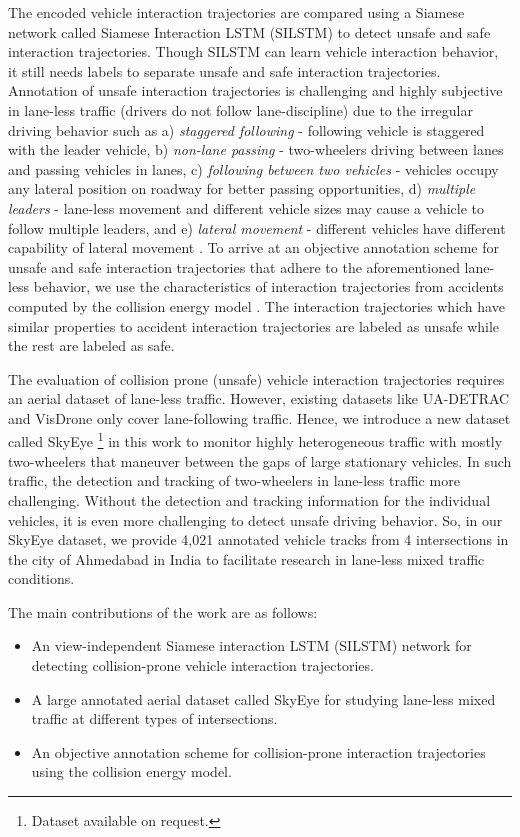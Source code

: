 \documentclass[final,journal]{IEEEtran}
\begin{document}
The encoded vehicle interaction trajectories are compared using a Siamese network called Siamese Interaction LSTM (SILSTM) to detect unsafe and safe interaction trajectories. Though SILSTM can learn vehicle interaction behavior, it still needs labels to separate unsafe and safe interaction trajectories. Annotation of unsafe interaction trajectories is challenging and highly subjective in lane-less traffic (drivers do not follow lane-discipline) due to the irregular driving behavior such as a) \textit{staggered following} - following vehicle is staggered with the leader vehicle, b) \textit{non-lane passing} - two-wheelers driving between lanes and passing vehicles in lanes, c) \textit{following between two vehicles} - vehicles occupy any lateral position on roadway for better passing opportunities, d) \textit{multiple leaders} - lane-less movement and different vehicle sizes may cause a vehicle to follow multiple leaders, and e) \textit{lateral movement} - different vehicles have different capability of lateral movement \cite{lanelessbehavior}. To arrive at an objective annotation scheme for unsafe and safe interaction trajectories that adhere to the aforementioned lane-less behavior, we use the characteristics of interaction trajectories from accidents computed by the collision energy model \cite{whoareyouwith}. The interaction trajectories which have similar properties to accident interaction trajectories are labeled as unsafe while the rest are labeled as safe.

The evaluation of collision prone (unsafe) vehicle interaction trajectories requires an aerial dataset of lane-less traffic. However, existing datasets like UA-DETRAC \cite{ua-detrac} and VisDrone \cite{visdrone}  only cover lane-following traffic. Hence, we introduce a new dataset called SkyEye \footnote{Dataset available on request.} in this work to monitor highly heterogeneous traffic with mostly two-wheelers that maneuver between the gaps of large stationary vehicles. In such traffic, the detection and tracking of two-wheelers in lane-less traffic more challenging. Without the detection and tracking information for the individual vehicles, it is even more challenging to detect unsafe driving behavior. So, in our SkyEye dataset, we provide 4,021 annotated vehicle tracks from 4 intersections in the city of Ahmedabad in India to facilitate research in lane-less mixed traffic conditions.

The main contributions of the work are as follows:
\begin{itemize}
    \item An view-independent Siamese interaction LSTM (SILSTM) network for detecting collision-prone vehicle interaction trajectories.
    \item A large annotated aerial dataset called SkyEye for studying lane-less mixed traffic at different types of intersections.
    \item An objective annotation scheme for collision-prone interaction trajectories using the collision energy model.
\end{itemize}
\end{document}
